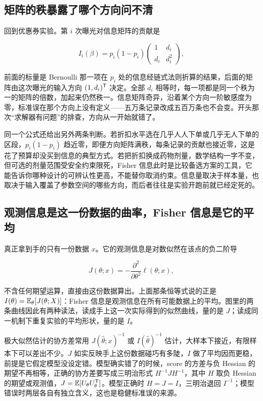 \subsection{矩阵的秩暴露了哪个方向问不清}

回到优惠券实验。第 \(i\) 次曝光对信息矩阵的贡献是

\[
I_i(\beta)=p_i(1-p_i)\begin{pmatrix}1&d_i\\ d_i&d_i^2\end{pmatrix},
\]

前面的标量是 Bernoulli 那一项在 \(p_i\) 处的信息经链式法则折算的结果，后面的矩阵由这次曝光的输入方向 \((1,d_i)^{\mathsf{T}}\) 决定。全部 \(d_i\) 相等时，每一项都是同一个秩为一的矩阵的倍数，加起来仍然秩一。信息矩阵奇异，沿着某个方向一阶敏感度为零，标准误在那个方向上没有定义——五万条记录改成五百万条也不会变。开头那次``求解器有问题''的排查，方向从一开始就错了。

同一个公式还给出另外两条判断。若折扣水平选在几乎人人下单或几乎无人下单的区段，\(p_i(1-p_i)\) 趋近零，即便方向矩阵满秩，每条记录的贡献也接近零，这是花了预算却没买到信息的典型方式。若把折扣换成药物剂量，数学结构一字不变，但可选的剂量范围受安全约束限死，Fisher 信息此时是比较备选方案的工具，它能告诉你哪种设计的可辨认性更高，不能替你取消约束。信息量取决于样本量，也取决于输入覆盖了参数空间的哪些方向，而后者往往是实验开跑前就已经定死的。

\subsection{观测信息是这一份数据的曲率，Fisher 信息是它的平均}

真正拿到手的只有一份数据 \(x\)。它的观测信息是对数似然在该点的负二阶导

\[
J(\theta;x)=-\frac{\partial^2}{\partial\theta^2}\ell(\theta;x),
\]

不含任何期望运算，直接由这份数据算出。上面那条恒等式说的正是 \(I(\theta)=\mathbb{E}_\theta[J(\theta;X)]\)：Fisher 信息是观测信息在所有可能数据上的平均。图里的两条曲线因此有两种读法，读成手上这一次实际得到的似然曲线，量的是 \(J\)；读成同一机制下重复实验的平均形状，量的是 \(I\)。

极大似然估计的协方差常用 \(J(\hat\theta;x)^{-1}\) 或 \(I(\hat\theta)^{-1}\) 估计，大样本下接近，有限样本下可以差出不少。\(J\) 如实反映手上这份数据碰巧有多陡，\(I\) 做了平均因而更稳，前提是它假定模型没设定错。模型确实错了的时候，score 的方差与负 Hessian 的期望不再相等，正确的协方差要写成三明治形式 \(H^{-1}JH^{-1}\)，其中 \(H\) 取负 Hessian 的期望或观测值，\(J=\mathbb{E}[U_\theta U_\theta^{\mathsf{T}}]\)。模型正确时 \(H=J=I\)，三明治退回 \(I^{-1}\)；模型错误时两层各自有独立含义，这也是稳健标准误的来源。

